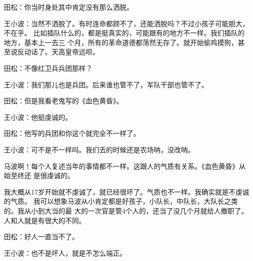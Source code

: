 田松：你当时身处其中肯定没有那么洒脱。


王小波：当然不洒脱了。有时连命都顾不了，还能洒脱吗？不过小孩子可能胆大，不在乎。
比如插队什么的，都是挺真实的，可能跟有的地方不一样。我们插队的地方，基本上一去三
个月，所有的革命道德都荡然无存了。就开始偷鸡摸狗，甚至说反动话了。天高皇帝远呗。



田松：不像红卫兵兵团那样？


王小波：我们那儿也是兵团。后来谁也管不了，军队干部也管不了。


田松：但是我看老鬼写的《血色黄昏》。


王小波：他挺虔诚的。


田松：他写的兵团和你这个就完全不一样了。


王小波：可不是不一样吗。我们去的时候还是农场呐，没改呐。


马波啊！每个人复述当年的事情都不一样。这跟人的气质有关系。《血色黄昏》从始至终还
是很虔诚的。


我大概从17岁开始就不虔诚了，就已经很坏了。气质也不一样。我确实就是不虔诚的气质。
我可以想象马波从小肯定都是好孩子，小队长，中队长，大队长之类的。我从小到大当的最
大的一次官是管4个人的，还当了没几个月就给人撤职了。人和人就是有很大的不同。


田松：好人一直当不了。


王小波：也不是坏人，就是不怎么端正。

